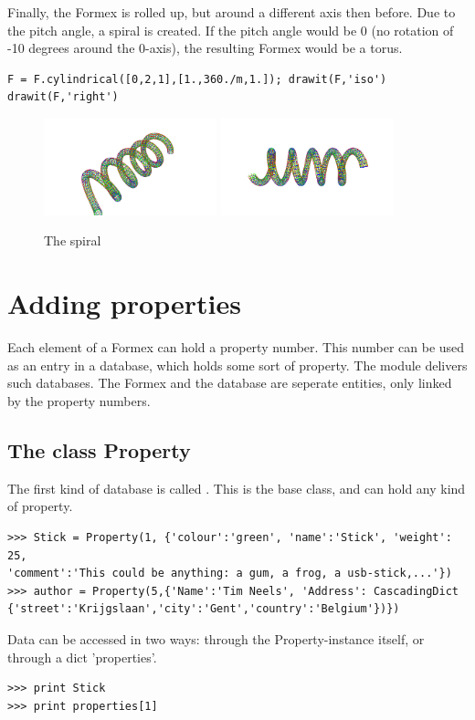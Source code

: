 {Finally, the Formex is rolled up, but around a different axis then before. 
Due to the pitch angle, a spiral is created. If the pitch angle would be 0 
(no rotation of -10 degrees around the 0-axis), the resulting Formex 
would be a torus. 
\begin{verbatim}
F = F.cylindrical([0,2,1],[1.,360./m,1.]); drawit(F,'iso')
drawit(F,'right')
\end{verbatim}
 \begin{figure}[h]
   \centering
   \begin{makeimage}
   \end{makeimage}
   \begin{latexonly}
     \includegraphics[width=5cm]{images/spiral-007}
     \includegraphics[width=5cm]{images/spiral-008}
   \end{latexonly}
   \begin{htmlonly}
   \end{htmlonly}  
   \caption{The spiral}
 \end{figure}

\section{Adding properties}
\label{sec:props}
Each element of a Formex can hold a property number. This number can be used as an entry in a database, which holds some sort of property. The module  delivers such databases. The Formex and the database are seperate entities, only linked by the property numbers. 

\subsection{The class Property}
The first kind of database is called . This is the base class, and can hold any kind of property.
\begin{verbatim}
>>> Stick = Property(1, {'colour':'green', 'name':'Stick', 'weight': 25, 
'comment':'This could be anything: a gum, a frog, a usb-stick,...'})
>>> author = Property(5,{'Name':'Tim Neels', 'Address': CascadingDict
{'street':'Krijgslaan','city':'Gent','country':'Belgium'})})
\end{verbatim}
Data can be accessed in two ways: through the Property-instance itself, or through a dict 'properties'. 
\begin{verbatim}    
>>> print Stick
>>> print properties[1] 


\end{verbatim}}

